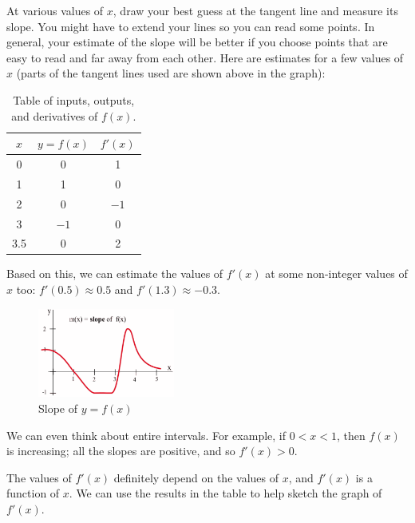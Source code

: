 \begin{example}
\begin{solution} At various values of $x$, draw your best guess at the tangent line and measure its slope. You might have to extend your lines so you can read some points. In general, your estimate of the slope will be better if you choose points that are easy to read and far away from each other. Here are estimates for a few values of $x$ (parts of the tangent lines used are shown above in the graph):
\begin{table}[ht!]
\begin{centering}
\begin{tabular}{ccc}
\toprule
$x$ &   $y=f(x)$    &	$f'(x)$\\
\midrule
0   &	0 &	1	\\
1   &	1 &	0	\\
2   &	0 &	$-1$  \\
3   &  $-1$ &	0	\\
3.5 &	0 &	2   \\
\bottomrule
\end{tabular}
\caption{Table of inputs, outputs, and derivatives of $f(x)$.}
\label{tab:2-3-deriv}
\end{centering}
\end{table}
Based on this, we can estimate the values of $f'(x)$ at some non-integer values of $x$ too: $f'(0.5)\approx   0.5$ and $f'(1.3)\approx   -0.3$.
\begin{figure}[!ht]
  \centering
    \includegraphics[width=0.4\textwidth]{img/chap2/image024.png}
    \caption{Slope of $y=f(x)$}
    \label{fig:2-3-fprimex}
\end{figure}
We can even think about entire intervals. For example, if $0<x<1$, then $f(x)$ is increasing; all the slopes are positive, and so $f'(x)>0$.

The values of $f'(x)$ definitely depend on the values of $x$, and $f'(x)$ is a function of $x$. We can use the results in the table to help sketch the graph of $f'(x)$.

\end{solution}\end{example}
